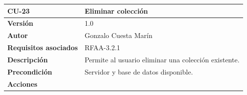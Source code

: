 \documentclass[
]{article}
\begin{document}
\begin{longtable}[]{@{}ll@{}}
\toprule
\begin{minipage}[b]{0.19\columnwidth}\raggedright
\textbf{CU-23}\strut
\end{minipage} & \begin{minipage}[b]{0.75\columnwidth}\raggedright
\textbf{Eliminar colección}\strut
\end{minipage}\tabularnewline
\midrule
\endhead
\begin{minipage}[t]{0.19\columnwidth}\raggedright
\textbf{Versión}\strut
\end{minipage} & \begin{minipage}[t]{0.75\columnwidth}\raggedright
1.0\strut
\end{minipage}\tabularnewline
\begin{minipage}[t]{0.19\columnwidth}\raggedright
\textbf{Autor}\strut
\end{minipage} & \begin{minipage}[t]{0.75\columnwidth}\raggedright
Gonzalo Cuesta Marín\strut
\end{minipage}\tabularnewline
\begin{minipage}[t]{0.19\columnwidth}\raggedright
\textbf{Requisitos asociados}\strut
\end{minipage} & \begin{minipage}[t]{0.75\columnwidth}\raggedright
RFAA-3.2.1\strut
\end{minipage}\tabularnewline
\begin{minipage}[t]{0.19\columnwidth}\raggedright
\textbf{Descripción}\strut
\end{minipage} & \begin{minipage}[t]{0.75\columnwidth}\raggedright
Permite al usuario eliminar una colección existente.\strut
\end{minipage}\tabularnewline
\begin{minipage}[t]{0.19\columnwidth}\raggedright
\textbf{Precondición}\strut
\end{minipage} & \begin{minipage}[t]{0.75\columnwidth}\raggedright
Servidor y base de datos disponible.\strut
\end{minipage}\tabularnewline
\begin{minipage}[t]{0.19\columnwidth}\raggedright
\textbf{Acciones}\strut
\end{minipage} & \begin{minipage}[t]{0.75\columnwidth}\raggedright
\begin{enumerate}

\end{enumerate}
\end{minipage}
\end{longtable}
\end{document}
